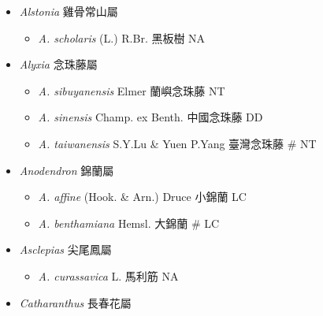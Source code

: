 
  \begin{itemize}
 \item[] \textit{Alstonia} 雞骨常山屬
                                
  \begin{itemize}
        \item[] \textit{A. scholaris} (L.) R.Br.  黑板樹   NA
  \end{itemize}
 \item[] \textit{Alyxia} 念珠藤屬
                                
  \begin{itemize}
        \item[] \textit{A. sibuyanensis} Elmer  蘭嶼念珠藤   NT
        \item[] \textit{A. sinensis} Champ. ex Benth.  中國念珠藤   DD
        \item[] \textit{A. taiwanensis} S.Y.Lu \& Yuen P.Yang  臺灣念珠藤  \# NT
  \end{itemize}
 \item[] \textit{Anodendron} 錦蘭屬
                                
  \begin{itemize}
        \item[] \textit{A. affine} (Hook. \& Arn.) Druce  小錦蘭   LC
        \item[] \textit{A. benthamiana} Hemsl.  大錦蘭  \# LC
  \end{itemize}
 \item[] \textit{Asclepias} 尖尾鳳屬
                                
  \begin{itemize}
        \item[] \textit{A. curassavica} L.  馬利筋   NA
  \end{itemize}
 \item[] \textit{Catharanthus} 長春花屬
                                

\end{itemize}
